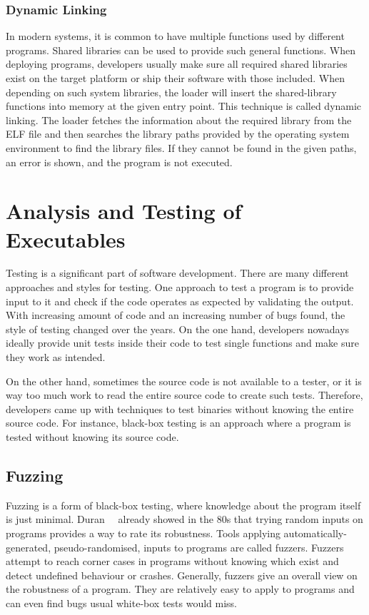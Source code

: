 \subsubsection{Dynamic Linking}

In modern systems, it is common to have multiple functions used by different
programs. Shared libraries can be used to provide such general functions. When
deploying programs, developers usually make sure all required shared libraries
exist on the target platform or ship their software with those included. When
depending on such system libraries, the loader will insert the shared-library
functions into memory at the given entry point. This technique is called dynamic
linking. The loader fetches the information about the required library from the
ELF file and then searches the library paths provided by the operating system
environment to find the library files. If they cannot be found in the given
paths, an error is shown, and the program is not executed.

\section{Analysis and Testing of Executables}

Testing is a significant part of software development. There are many different
approaches and styles for testing. One approach to test a program is to provide
input to it and check if the code operates as expected by validating the output.
With increasing amount of code and an increasing number of bugs found, the style
of testing changed over the years. On the one hand, developers nowadays ideally
provide unit tests inside their code to test single functions and make sure they
work as intended.

On the other hand, sometimes the source code is not available to a tester, or it
is way too much work to read the entire source code to create such tests.
Therefore, developers came up with techniques to test binaries without knowing
the entire source code. For instance, black-box testing is an approach where a
program is tested without knowing its source code.

\subsection{Fuzzing}

Fuzzing is a form of black-box testing, where knowledge about the program itself
is just minimal. Duran~\etal~\cite{randtest} already showed in the 80s that
trying random inputs on programs provides a way to rate its robustness. Tools
applying automatically-generated, pseudo-randomised, inputs to programs are
called fuzzers. Fuzzers attempt to reach corner cases in programs without
knowing which exist and detect undefined behaviour or crashes. Generally,
fuzzers give an overall view on the robustness of a program. They are relatively
easy to apply to programs and can even find bugs usual white-box tests would
miss.

